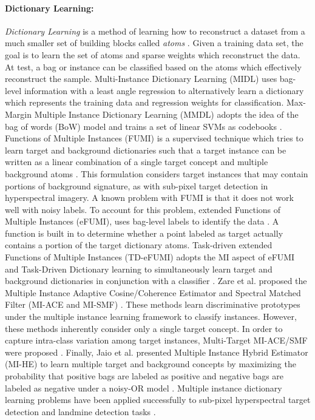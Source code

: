 \paragraph{Dictionary Learning:}
\textit{Dictionary Learning} is a method of learning how to reconstruct a dataset from a much smaller set of building blocks called \textit{atoms} \citep{Cook2015Thesis}.  Given a training data set, the goal is to learn the set of atoms and sparse weights which reconstruct the data.  At test, a bag or instance can be classified based on the atoms which effectively reconstruct the sample.  Multi-Instance Dictionary Learning (MIDL) uses bag-level information with a least angle regression to alternatively learn a dictionary which represents the training data and regression weights for classification.  Max-Margin Multiple Instance Dictionary Learning (MMDL) adopts the idea of the bag of words (BoW) model and trains a set of linear SVMs as codebooks \citep{Jiao2017Thesis}. Functions of Multiple Instances (FUMI) is a supervised technique which tries to learn target and background dictionaries such that a target instance can be written as a linear combination of a single target concept and multiple background atoms .  This formulation considers target instances that may contain portions of background signature, as with sub-pixel target detection in hyperspectral imagery.  A known problem with FUMI is that it does not work well with noisy labels.  To account for this problem, extended Functions of Multiple Instances (eFUMI), uses bag-level labels to identify the data \citep{Jiao2017Thesis,Cook2015Thesis}.  A function is built in to determine whether a point labeled as target actually contains a portion of the target dictionary atoms. Task-driven extended Functions of Multiple Instances (TD-eFUMI) adopts the MI aspect of eFUMI and Task-Driven Dictionary learning to simultaneously learn target and background dictionaries in conjunction with a classifier \citep{Cook2016LandmineTaskDriveneFUMI}. Zare et al. proposed the Multiple Instance Adaptive Cosine/Coherence Estimator and Spectral Matched Filter (MI-ACE and MI-SMF) \citep{Zare2016MIACE}.  These methods learn discriminative prototypes under the multiple instance learning framework to classify instances.  However, these methods inherently consider only a single target concept.  In order to capture intra-class variation among target instances, Multi-Target MI-ACE/SMF were proposed \citep{Bocinsky2019Thesis}.  Finally, Jaio et al. presented Multiple Instance Hybrid Estimator (MI-HE) to learn multiple target and background concepts by maximizing the probability that positive bags are labeled as positive and negative bags are labeled as negative under a noisy-OR model \citep{Jiao2018MIHE2,Bocinsky2019Thesis}.  Multiple instance dictionary learning problems have been applied successfully to sub-pixel hyperspectral target detection and landmine detection tasks \citep{Bocinsky2019Thesis, Zare2015MILLandmineEMI, Zare2016MIACE, Cook2016LandmineTaskDriveneFUMI, Jiao2018MIHE2}. 


